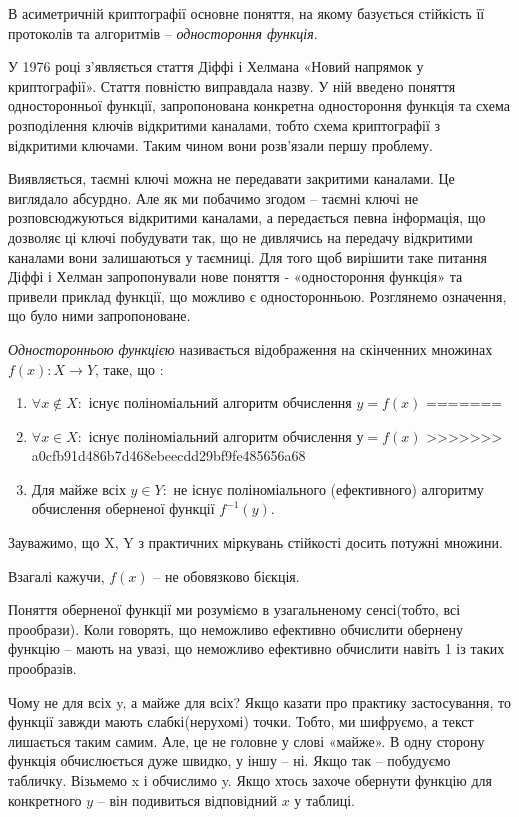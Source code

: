 В асиметричній криптографії основне поняття, на якому базується стійкість її протоколів та алгоритмів – \textit{одностороння функція}. 

У 1976 році з’являється стаття Діффі і Хелмана «Новий напрямок у криптографії». Стаття повністю виправдала назву. У ній введено поняття односторонньої функції, запропонована конкретна одностороння функція та схема розподілення ключів відкритими каналами, тобто схема криптографії з відкритими ключами. Таким чином вони розв’язали першу проблему.

Виявляється, таємні ключі можна не передавати закритими каналами. Це виглядало абсурдно. Але як ми побачимо згодом – таємні ключі не розповсюджуються відкритими каналами, а передається певна інформація, що дозволяє ці ключі побудувати так, що не дивлячись на передачу відкритими каналами вони залишаються у таємниці. Для того щоб вирішити таке питання Діффі і Хелман запропонували нове поняття - «одностороння функція» та привели приклад функції, що можливо є односторонньою. Розглянемо означення, що було ними запропоноване.

\begin{mydef}
\textit{Односторонньою функцією} називається відображення на скінченних множинах \( f(x) : X\rightarrow Y \), таке, що :
\begin{enumerate}
<<<<<<< HEAD
\item $\forall x \notin X \colon$ існує поліноміальний алгоритм обчислення $y = f(x)$
=======
\item $\forall x \in X \colon$ існує поліноміальний алгоритм обчислення $у = f(x)$
>>>>>>> a0cfb91d486b7d468ebeecdd29bf9fe485656a68

\item Для майже всіх $y\in Y \colon$ не існує поліноміального (ефективного) алгоритму обчислення оберненої функції $f^{-1}(y)$.
\end{enumerate}
Зауважимо, що X, Y з практичних міркувань стійкості досить потужні множини.\par Взагалі кажучи, $f(x)$ – не обовязково бієкція.
\end{mydef}

Поняття оберненої функції ми розуміємо в узагальненому сенсі(тобто, всі прообрази). Коли говорять, що неможливо ефективно обчислити обернену функцію – мають на увазі, що неможливо ефективно обчислити навіть 1 із таких прообразів.

Чому не для всіх y, а майже для всіх? Якщо казати про практику застосування, то функції завжди мають слабкі(нерухомі) точки. Тобто, ми шифруємо, а текст лишається таким самим. Але, це не головне у слові «майже». В одну сторону функція обчислюється дуже швидко, у іншу – ні. Якщо так – побудуємо  табличку. Візьмемо x і обчислимо y. Якщо хтось захоче обернути функцію для конкретного $y$ – він подивиться відповідний $x$ у таблиці. 

